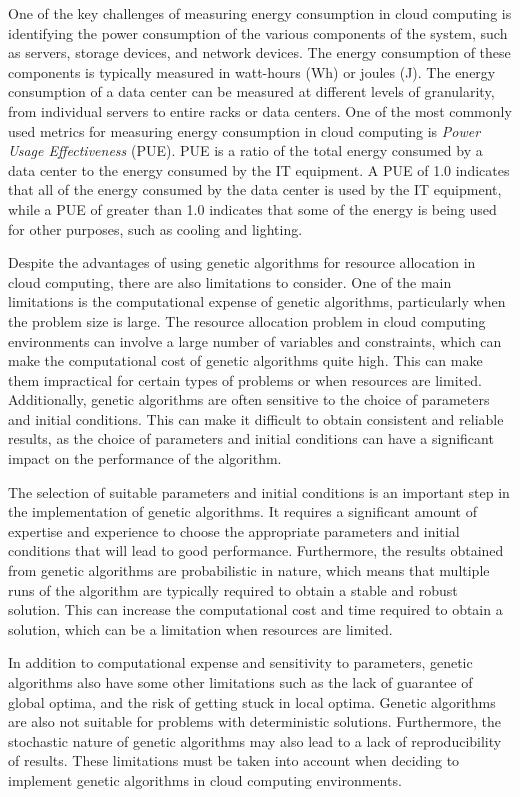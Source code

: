 One of the key challenges of measuring energy consumption in cloud computing is identifying the power consumption of the various components of the system, 
such as servers, storage devices, and network devices. 
The energy consumption of these components is typically measured in watt-hours (Wh) or joules (J). 
The energy consumption of a data center can be measured at different levels of granularity, from individual servers to entire racks or data centers. 
One of the most commonly used metrics for measuring energy consumption in cloud computing is \textit{Power Usage Effectiveness} (PUE). 
PUE is a ratio of the total energy consumed by a data center to the energy consumed by the IT equipment. 
A PUE of 1.0 indicates that all of the energy consumed by the data center is used by the IT equipment, while a PUE of greater than 1.0 
indicates that some of the energy is being used for other purposes, such as cooling and lighting.

Despite the advantages of using genetic algorithms for resource allocation in cloud computing, there are also limitations to consider. 
One of the main limitations is the computational expense of genetic algorithms, particularly when the problem size is large. 
The resource allocation problem in cloud computing environments can involve a large number of variables and constraints, 
which can make the computational cost of genetic algorithms quite high. This can make them impractical for certain types of problems or when resources are limited. 
Additionally, genetic algorithms are often sensitive to the choice of parameters and initial conditions. This can make it difficult to obtain consistent and reliable results, 
as the choice of parameters and initial conditions can have a significant impact on the performance of the algorithm.

The selection of suitable parameters and initial conditions is an important step in the implementation of genetic algorithms. 
It requires a significant amount of expertise and experience to choose the appropriate parameters and initial conditions that will lead to good performance. 
Furthermore, the results obtained from genetic algorithms are probabilistic in nature, which means that multiple runs of the algorithm are typically required 
to obtain a stable and robust solution. This can increase the computational cost and time required to obtain a solution, which can be a limitation when resources are limited.

In addition to computational expense and sensitivity to parameters, genetic algorithms also have some other limitations such as the lack of guarantee of global optima, 
and the risk of getting stuck in local optima. Genetic algorithms are also not suitable for problems with deterministic solutions. 
Furthermore, the stochastic nature of genetic algorithms may also lead to a lack of reproducibility of results. 
These limitations must be taken into account when deciding to implement genetic algorithms in cloud computing environments.

